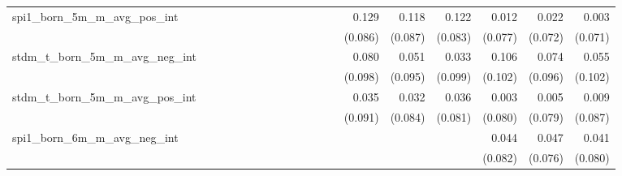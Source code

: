 \begin{tabular}{lrrrrrrrrrrrrrrrrrr}
spi1\_born\_5m\_m\_avg\_pos\_int            &             &             &             &             &             &             &             &             &             &             &             &             &       0.129 &       0.118 &       0.122 &       0.012 &       0.022 &       0.003 \\ 
                                            &             &             &             &             &             &             &             &             &             &             &             &             &     (0.086) &     (0.087) &     (0.083) &     (0.077) &     (0.072) &     (0.071) \\ 
stdm\_t\_born\_5m\_m\_avg\_neg\_int         &             &             &             &             &             &             &             &             &             &             &             &             &       0.080 &       0.051 &       0.033 &       0.106 &       0.074 &       0.055 \\ 
                                            &             &             &             &             &             &             &             &             &             &             &             &             &     (0.098) &     (0.095) &     (0.099) &     (0.102) &     (0.096) &     (0.102) \\ 
stdm\_t\_born\_5m\_m\_avg\_pos\_int         &             &             &             &             &             &             &             &             &             &             &             &             &       0.035 &       0.032 &       0.036 &       0.003 &       0.005 &       0.009 \\ 
                                            &             &             &             &             &             &             &             &             &             &             &             &             &     (0.091) &     (0.084) &     (0.081) &     (0.080) &     (0.079) &     (0.087) \\ 
spi1\_born\_6m\_m\_avg\_neg\_int            &             &             &             &             &             &             &             &             &             &             &             &             &             &             &             &       0.044 &       0.047 &       0.041 \\ 
                                            &             &             &             &             &             &             &             &             &             &             &             &             &             &             &             &     (0.082) &     (0.076) &     (0.080) \\ 

\end{tabular}
